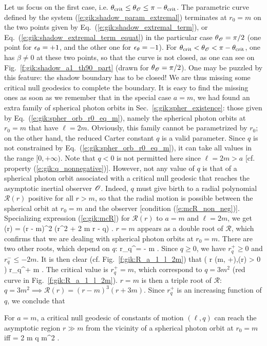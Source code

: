 Let us focus on the first case, i.e. $\theta_{\rm crit} \leq \theta_{\mathscr{O}} \leq \pi - \theta_{\rm crit}$.
The parametric curve defined by
the system (\ref{e:gik:shadow_param_extremal}) terminates at $r_0 = m$ on the two points
given by Eq.~(\ref{e:gik:shadow_extremal_term}), or Eq.~(\ref{e:gik:shadow_extremal_term_equat})
in the particular case $\theta_{\mathscr{O}} = \pi/2$ (one point for $\epsilon_\theta=+1$, and the other one
for $\epsilon_\theta=-1$). For $\theta_{\rm crit} < \theta_{\mathscr{O}} < \pi - \theta_{\rm crit}$, one has
$\beta \neq 0$ at these two points, so that the curve is not closed, as one can see
on Fig.~\ref{f:gik:shadow_a1_th90_part} (drawn for $\theta_{\mathscr{O}} = \pi/2$).
One may be puzzled by this feature: the shadow boundary has to be closed!
We are thus missing some critical null geodesics to complete the boundary.
It is easy to find the missing ones as soon as we remember that in the
special case $a=m$, we had found an extra family of spherical photon orbits
in Sec.~\ref{s:gik:spher_existence}: those given by Eq.~(\ref{e:gik:spher_orb_r0_eq_m}),
namely the spherical photon orbits at $r_0 = m$ that have
$\ell = 2m$. Obviously, this family cannot be parametrized by $r_0$; on the other hand,
the reduced Carter constant $q$ is a valid parameter. Since $q$ is
not constrained by Eq.~(\ref{e:gik:spher_orb_r0_eq_m}), it can take all
values in the range $[0, +\infty)$. Note that $q<0$ is not permitted here
since $\ell = 2 m > a$ [cf. property (\ref{e:gik:q_nonnegative})].
However, not any value of $q$ is that of a spherical photon orbit associated
with a critical null geodesic that reaches the asymptotic inertial observer $\mathscr{O}$.
Indeed, $q$ must give birth to a radial polynomial
$\mathcal{R}(r)$ positive for all $r > m$, so that the radial
motion is possible between the spherical orbit at $r_0=m$
 and the observer [condition (\ref{e:mcR_non_neg})].
Specializing expression (\ref{e:gik:mcR}) for $\mathcal{R}(r)$ to $a=m$ and $\ell=2m$,
we get
\be
    (r) = (r - m)^2 (r^2 + 2 m r - q) .
\ee
$r = m$ appears as a double root of $\mathcal{R}$, which confirms that we are dealing
with spherical photon orbits at $r_0 = m$. There are two other roots, which depend
on $q$:
\be \label{e:gik:root_rq}
    r_q^\pm = \pm {} - m .
\ee
Since $q\geq 0$, we have $r_q^+ \geq 0$ and $r_q^- \leq - 2m$.
It is then clear (cf. Fig.~\ref{f:gik:R_a_1_l_2m}) that
\be
     \left( \forall r \in (m, +\infty),\quad  {}(r) > 0 \right) \iff r_q^+ \leq m .
\ee
The critical value is $r_q^+ = m$, which correspond to $q = 3 m^2$ (red curve
in Fig.~\ref{f:gik:R_a_1_l_2m}). $r=m$ is then a triple root of $\mathcal{R}$:
$q = 3 m^2 \implies \mathcal{R}(r) = ( r - m)^3 (r + 3m)$. Since $r_q^+$
is an increasing function of $q$, we conclude that
\begin{greybox}
For $a=m$, a critical null geodesic
of constants of motion $(\ell, q)$ can reach the asymptotic region $r\gg m$
from the vicinity of a spherical photon orbit at $r_0 = m$ iff
\be \label{e:gik:critical_from_NHEK}
    \ell = 2 m  \leq q  m^2 .
\ee
\end{greybox}

